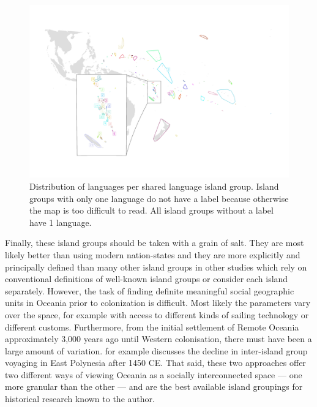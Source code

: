 \documentclass[unnumsec,webpdf,modern,medium]{oup-authoring-template}
\begin{document}
\begin{appendices}
\begin{figure}
\centering
\includegraphics[width=\textwidth]{polygon_medium_group_map_vanuatu_mh_inset}
\caption{{Distribution of languages per shared language island group. Island groups with only one language do not have a label because otherwise the map is too difficult to read. All island groups without a label have 1 language.}}
\label{polygon_plot_medium}
\end{figure}

Finally, these island groups should be taken with a grain of salt. They are most likely better than using modern nation-states and they are more explicitly and principally defined than many other island groups in other studies which rely on conventional definitions of well-known island groups or consider each island separately. However, the task of finding definite meaningful social geographic units in Oceania prior to colonization is difficult. Most likely the parameters vary over the space, for example with access to different kinds of sailing technology or different customs. Furthermore, from the initial settlement of Remote Oceania approximately 3,000 years ago until Western colonisation, there must have been a large amount of variation. \citep{rolett2002voyaging} for example discusses the decline in inter-island group voyaging in East Polynesia after 1450 CE. That said, these two approaches offer two different ways of viewing Oceania as a socially interconnected space --- one more granular than the other --- and are the best available island groupings for historical research known to the author.




\end{appendices}
\end{document}
